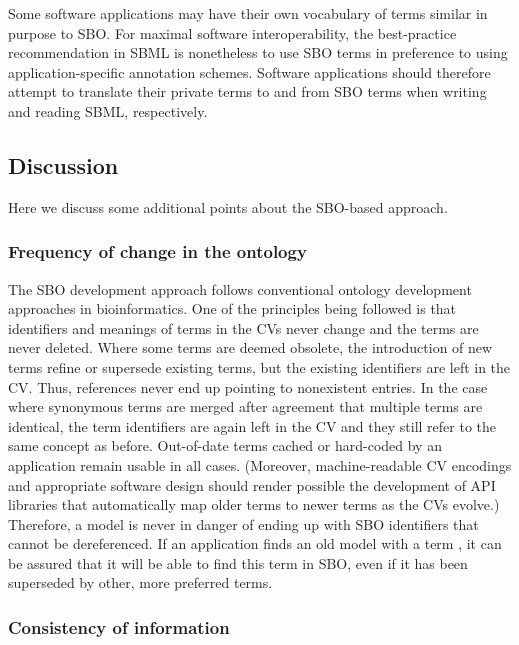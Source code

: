 Some software applications may have their own vocabulary of terms
similar in purpose to SBO.  For maximal software interoperability,
the best-practice recommendation in SBML is nonetheless to use SBO
terms in preference to using application-specific annotation
schemes.  Software applications should therefore attempt to
translate their private terms to and from SBO terms when writing
and reading SBML, respectively.


\subsection{Discussion}

Here we discuss some additional points about the SBO-based
approach.

\subsubsection{Frequency of change in the ontology}
\label{sec:sbo-frequency-of-change}

The SBO development approach follows conventional ontology
development approaches in bioinformatics.  One of the principles
being followed is that identifiers and meanings of terms in the
CVs never change and the terms are never deleted.  Where some
terms are deemed obsolete, the introduction of new terms refine or
supersede existing terms, but the existing identifiers are left in
the CV.  Thus, references never end up pointing to nonexistent
entries.  In the case where synonymous terms are merged after
agreement that multiple terms are identical, the term identifiers
are again left in the CV and they still refer to the same concept
as before.  Out-of-date terms cached or hard-coded by an
application remain usable in all cases.  (Moreover,
machine-readable CV encodings and appropriate software design
should render possible the development of API libraries that
automatically map older terms to newer terms as the CVs evolve.)
Therefore, a model is never in danger of ending up with SBO
identifiers that cannot be dereferenced.  If an application finds
an old model with a term , it can be assured
that it will be able to find this term in SBO, even if it has been
superseded by other, more preferred terms.


\subsubsection{Consistency of information}

